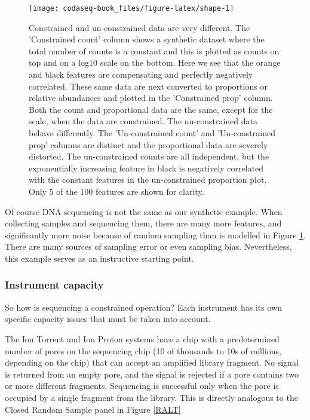 \documentclass[
  onecolumn]{article}
\begin{document}
\begin{figure}

{\centering \texttt{[image: codaseq-book\_files/figure-latex/shape-1]} 

}

\caption{Constrained and un-constrained data are very different. The 'Constrained count' column shows a synthetic dataset where the total number of counts is a constant and this is plotted as counts on top and on a log10 scale on the bottom. Here we see that the orange and black features are compensating and perfectly negatively correlated. These same data are next converted to proportions or relative abundances and plotted in the 'Constrained prop' column. Both the count and proportional data are the same, except for the scale, when the data are constrained. The un-constrained data behave differently. The 'Un-constrained count' and 'Un-constrained prop' columns are distinct and the proportional data are severely distorted. The un-constrained counts are all independent, but the  exponentially increasing feature in black is negatively correlated with the constant features in the un-constrained proportion plot. Only 5 of the 100 features are shown for clarity.}\label{fig:shape}
\end{figure}

Of course DNA sequencing is not the same as our synthetic example. When collecting samples and sequencing them, there are many more features, and significantly more noise because of random sampling than is modelled in Figure \ref{fig:shape}. There are many sources of sampling error or even sampling bias. Nevertheless, this example serves as an instructive starting point.

\hypertarget{instrument-capacity}{%
\subsubsection{Instrument capacity}\label{instrument-capacity}}

So how is sequencing a constrained operation? Each instrument has its own specific capacity issues that must be taken into account.

The Ion Torrent and Ion Proton systems have a chip with a predetermined number of pores on the sequencing chip (10 of thousands to 10s of millions, depending on the chip) that can accept an amplified library fragment. No signal is returned from an empty pore, and the signal is rejected if a pore contains two or more different fragments. Sequencing is successful only when the pore is occupied by a single fragment from the library. This is directly analogous to the Closed Random Sample panel in Figure \ref{RALT}
\end{document}
